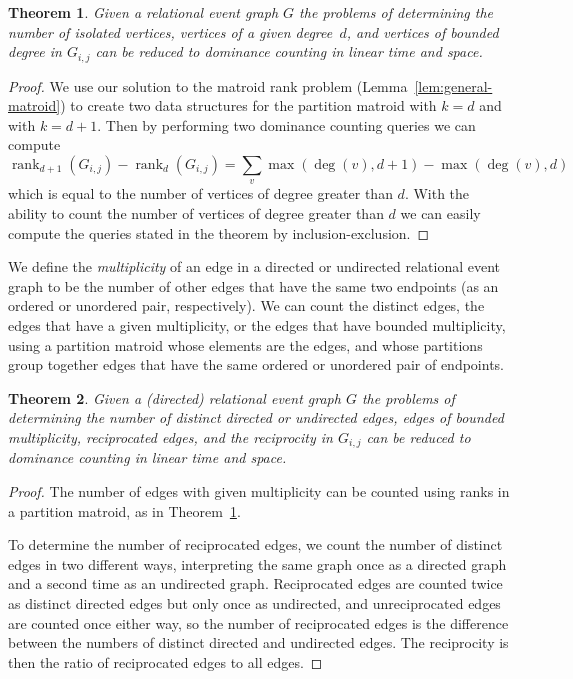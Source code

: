 \documentclass[11pt]{article}
\DeclareMathOperator{\rank}{rank}
\newtheorem{theorem}{Theorem}
\begin{document}
\begin{theorem}\label{thm:vertex-degree}
Given a relational event graph $G$ the problems of determining the number of isolated vertices, vertices of a given degree~$d$, and vertices of bounded degree in $G_{i,j}$ can be reduced to dominance counting in linear time and space.
\end{theorem}

\begin{proof}
We use our solution to the matroid rank problem (Lemma~\ref{lem:general-matroid}) to create two data structures for the partition matroid with $k = d$ and with $k = d+1$. Then by performing two dominance counting queries we can compute
\[
\rank_{d+1}(G_{i,j}) - \rank_{d}(G_{i,j}) = \sum_v \max(\deg(v), d+1) - \max(\deg(v), d)
\]
which is equal to the number of vertices of degree greater than $d$. With the ability to count the number of vertices of degree greater than $d$ we can easily compute the queries stated in the theorem by inclusion-exclusion.
\end{proof}

We define the \emph{multiplicity} of an edge in a directed or undirected relational event graph to be the number of other edges that have the same two endpoints (as an ordered or unordered pair, respectively).
We can count the distinct edges, the edges that have a given multiplicity, or the edges that have bounded multiplicity, using a partition matroid whose elements are the edges, and whose partitions group together edges that have the same ordered or unordered pair of endpoints.

\begin{theorem}
Given a (directed) relational event graph $G$ the problems of determining the number of distinct directed or undirected edges, edges of bounded multiplicity, reciprocated edges, and the reciprocity in  $G_{i,j}$ can be reduced to dominance counting in linear time and space.
\end{theorem}

\begin{proof}
The number of edges with given multiplicity can be counted using ranks in a partition matroid, as in Theorem~\ref{thm:vertex-degree}.

To determine the number of reciprocated edges, we count the number of distinct edges in two different ways, interpreting the same graph once as a directed graph and a second time as an undirected graph. Reciprocated edges are counted twice as distinct directed edges but only once as undirected, and unreciprocated edges are counted once either way, so the number of reciprocated edges is the difference between the numbers of distinct directed and undirected edges. The reciprocity is then the ratio of reciprocated edges to all edges.
\end{proof}
\end{document}
